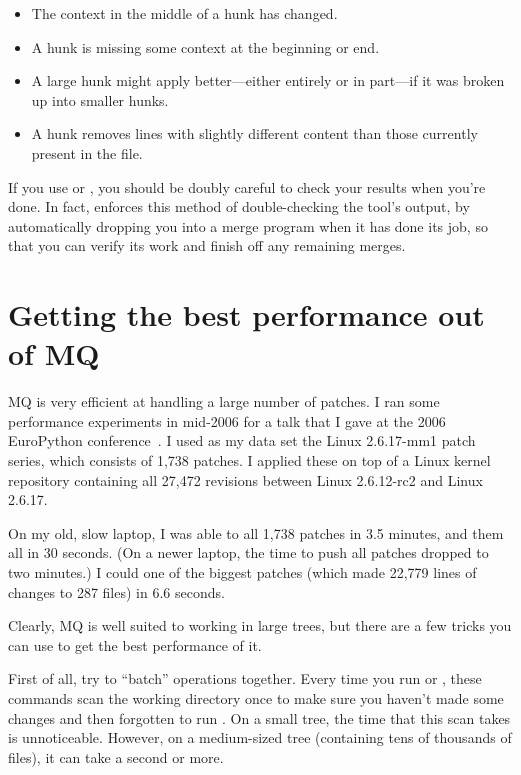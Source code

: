 \begin{itemize}
\item The context in the middle of a hunk has changed.
\item A hunk is missing some context at the beginning or end.
\item A large hunk might apply better---either entirely or in
  part---if it was broken up into smaller hunks.
\item A hunk removes lines with slightly different content than those
  currently present in the file.
\end{itemize}

If you use  or , you should be doubly
careful to check your results when you're done.  In fact,
 enforces this method of double-checking the tool's
output, by automatically dropping you into a merge program when it has
done its job, so that you can verify its work and finish off any
remaining merges.

\section{Getting the best performance out of MQ}
\label{sec:mq:perf}

MQ is very efficient at handling a large number of patches.  I ran
some performance experiments in mid-2006 for a talk that I gave at the
2006 EuroPython conference~\cite{web:europython}.  I used as my data
set the Linux 2.6.17-mm1 patch series, which consists of 1,738
patches.  I applied these on top of a Linux kernel repository
containing all 27,472 revisions between Linux 2.6.12-rc2 and Linux
2.6.17.

On my old, slow laptop, I was able to
 all 1,738 patches in 3.5 minutes,
and  them all in 30 seconds.  (On a
newer laptop, the time to push all patches dropped to two minutes.)  I
could  one of the biggest patches (which made 22,779
lines of changes to 287 files) in 6.6 seconds.

Clearly, MQ is well suited to working in large trees, but there are a
few tricks you can use to get the best performance of it.

First of all, try to ``batch'' operations together.  Every time you
run  or , these commands scan the working
directory once to make sure you haven't made some changes and then
forgotten to run .  On a small tree, the time that
this scan takes is unnoticeable.  However, on a medium-sized tree
(containing tens of thousands of files), it can take a second or more.

